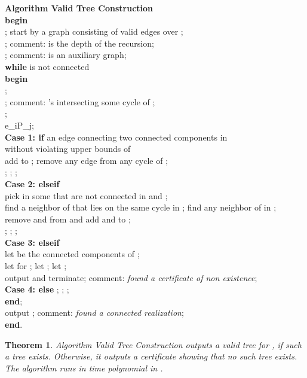\documentclass[12pt,a4paper]{article}
\theoremstyle{definition}
\theoremstyle{plain}
\newtheorem{thm}[dfn]{Theorem}
\begin{document}
\noindent
{\bf Algorithm Valid Tree Construction}
\\
{\bf begin}\\
;
start by a graph  consisting of
 valid edges over ;\\
; comment:  is the depth of the recursion;\\ 
; comment:  is an auxiliary graph;\\
{\bf while}  is not connected\\
 {\bf begin}\\
 ;\\
 ;
comment: 's intersecting some cycle of ;\\
 ;\\
 e_{i}\in P_j;\\
 {\bf Case 1: if}
        an edge 
                 connecting two connected components in \\
 without violating upper bounds of  \\
 add  to ; remove any edge from any cycle of ;\\
 ;
           ; ;\\
 {\bf Case 2: elseif} \\
 pick  in some 
           that are not connected in  and ;\\
 find a neighbor  of  that lies on the same cycle in  ;
           find any neighbor  of  in ;\\
 remove  and  from  and add  and  to ;\\
 ;
           ; ;\\
 {\bf Case 3: elseif} \\
 let 
           be the connected components of ;\\
 let  for ;
           let ;
           let ; \\
 output  and terminate;
           comment: {\it found a certificate of non existence};\\
 {\bf Case 4: else} ;
                   ; ;\\
{\bf end};\\ 
output ; comment: {\it found a connected realization};\\
{\bf end}.
\begin{thm}
\label{thm:algorithm2}
Algorithm Valid Tree Construction outputs 
a valid tree for 
,
if such a tree exists. 
Otherwise, it outputs a certificate  showing that 
no such tree exists.
The algorithm runs in time polynomial in . 
\end{thm}
\end{document}
